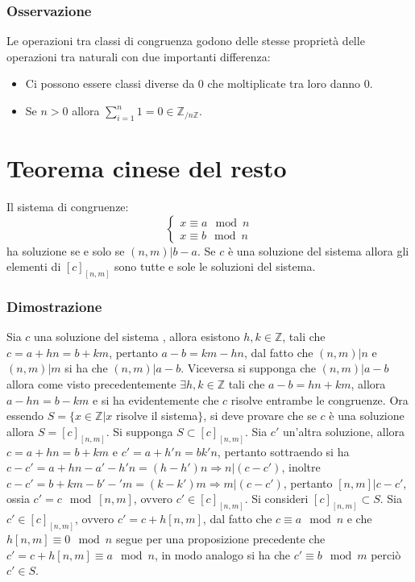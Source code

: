 \subsubsection{Osservazione}
Le operazioni tra classi di congruenza godono delle stesse propriet\`a delle operazioni tra naturali con due importanti differenza:
\begin{itemize}
\item Ci possono essere classi diverse da $0$ che moltiplicate tra loro danno $0$.
\item Se $n>0$ allora $\sum\limits_{i=1}^n 1=0\in\mathbb{Z}_{/n\mathbb{Z}}$.
\end{itemize}
\section{Teorema cinese del resto}
Il sistema di congruenze:
\begin{equation*}
\begin{cases}
x\equiv a\mod n\\
x\equiv b\mod n
\end{cases}
\end{equation*}
ha soluzione se e solo se $(n,m)|b-a$. Se $c$ \`e una soluzione del sistema allora gli elementi di $[c]_{[n,m]}$ sono tutte e sole le soluzioni del sistema.
\subsubsection{Dimostrazione}
Sia $c$ una soluzione del sistema , allora esistono $h,k\in\mathbb{Z}$, tali che $c=a+hn=b+km$, pertanto $a-b=km-hn$, dal fatto che $(n,m)|n$ e $(n,m)|m$ si ha che $(n,m)|a-b$.
Viceversa si supponga che $(n,m)|a-b$ allora come visto precedentemente $\exists h,k\in\mathbb{Z}$ tali che $a-b=hn+km$, allora $a-hn=b-km$ e si ha evidentemente che $c$ 
risolve entrambe le congruenze. Ora essendo $S=\{x\in\mathbb{Z}|x$ risolve il sistema$\}$, si deve provare che se $c$ \`e una soluzione allora $S=[c]_{[n,m]}$. Si supponga
$S\subset [c]_{[n,m]}$. Sia $c'$ un'altra soluzione, allora $c=a+hn=b+km$ e $c'=a+h'n=bk'n$, pertanto sottraendo si ha $c-c'=a+hn-a'-h'n=(h-h')n\Rightarrow n|(c-c')$, inoltre
$c-c'=b+km-b'-'m=(k-k')m\Rightarrow m|(c-c')$, pertanto $[n,m]|c-c'$, ossia $c'=c\mod [n,m]$, ovvero $c'\in [c]_{[n,m]}$. Si consideri $[c]_{[n,m]}\subset S$. Sia 
$c'\in[c]_{[n,m]}$, ovvero $c'=c+h[n,m]$, dal fatto che $c\equiv a\mod n$ e che $h[n,m]\equiv 0\mod n$ segue per una proposizione precedente che $c'=c+h[n,m]\equiv a\mod n$, 
in modo analogo si ha che $c'\equiv b\mod m$ perci\`o $c'\in S$.